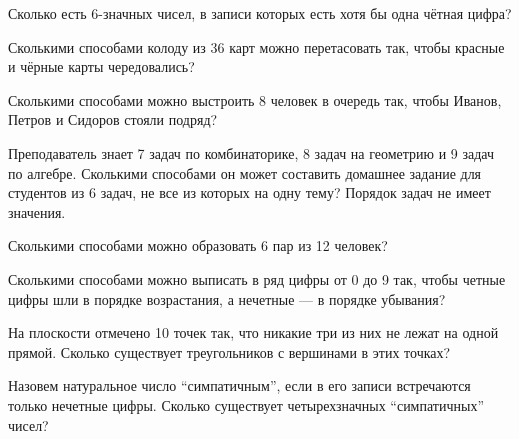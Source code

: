 \begin{problems}

\item Сколько есть 6-значных чисел, в записи которых есть хотя бы одна чётная цифра?

\item Сколькими способами колоду из 36 карт можно перетасовать так, чтобы красные и чёрные карты
чередовались?



\item Сколькими способами можно выстроить 8 человек в очередь так, чтобы Иванов, Петров и Сидоров
стояли подряд?

\item Преподаватель знает 7 задач по комбинаторике, 8 задач на геометрию и 9 задач по алгебре. Сколькими способами он может составить домашнее задание для студентов из 6 задач, не все из которых на одну тему? Порядок задач не имеет значения.

\item Сколькими способами можно образовать 6 пар из 12 человек?

\item Сколькими способами можно выписать в ряд цифры от 0 до 9 так, чтобы четные цифры шли в порядке возрастания, а нечетные — в порядке убывания?

\item На плоскости отмечено 10 точек так, что никакие три из них не лежат на одной прямой. Сколько существует треугольников с вершинами в этих точках?

\item Назовем натуральное число ``симпатичным'', если в его записи встречаются только нечетные цифры. Сколько существует четырехзначных ``симпатичных'' чисел? 


\end{problems}
